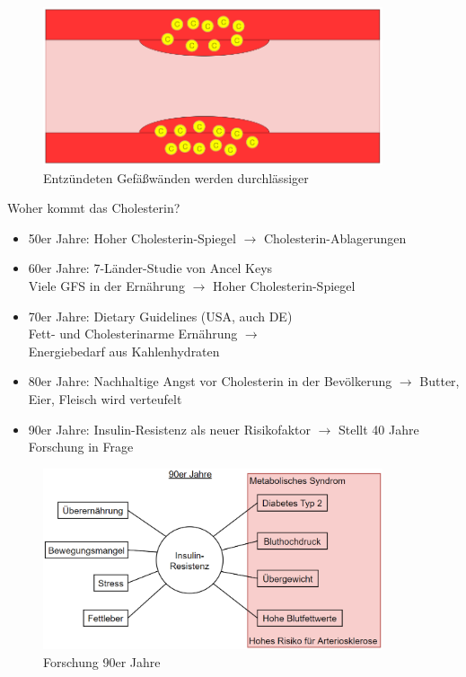 \documentclass[xcolor=dvipsnames]{beamer}
\begin{document}
\begin{frame}[allowframebreaks]
        \framebreak

        \begin{figure}
            \centering
            \includegraphics[width=10cm]{../images/ader_4.png}
            \caption{Entzündeten Gefäßwänden werden durchlässiger}
        \end{figure}

        \framebreak

        \begin{block}{Woher kommt das Cholesterin?}
            \begin{itemize}
                \setlength\itemsep{1em}
                \item 50er Jahre: Hoher Cholesterin-Spiegel $\rightarrow$ Cholesterin-Ablagerungen
                \item 60er Jahre: 7-Länder-Studie von Ancel Keys\\ Viele GFS in der Ernährung $\rightarrow$ Hoher Cholesterin-Spiegel
                \item 70er Jahre: Dietary Guidelines (USA, auch DE)\\ Fett- und Cholesterinarme Ernährung $\rightarrow$\\ Energiebedarf aus Kahlenhydraten
                \item 80er Jahre: Nachhaltige Angst vor Cholesterin in der Bevölkerung $\rightarrow$ Butter, Eier, Fleisch wird verteufelt
                \item 90er Jahre: Insulin-Resistenz als neuer Risikofaktor $\rightarrow$ Stellt  40 Jahre Forschung in Frage
            \end{itemize}
        \end{block}

        \framebreak

        \begin{figure}
            \centering
            \includegraphics[width=10cm]{../images/90er.png}
            \caption{Forschung 90er Jahre}
        \end{figure}


\end{frame}
\end{document}

